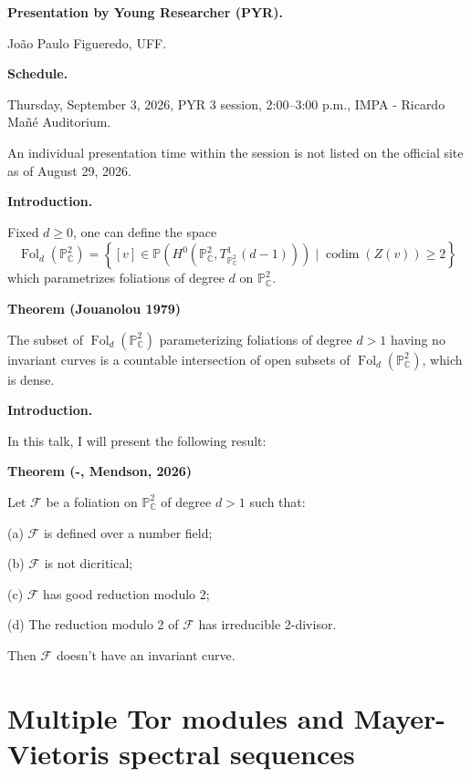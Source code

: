 \medskip\noindent
{\bf Presentation by Young Researcher
(PYR).}

Jo\~ao Paulo Figueredo,
UFF.

\medskip\noindent
{\bf Schedule.}

Thursday, September 3, 2026,
PYR 3 session, 2:00--3:00 p.m.,
IMPA - Ricardo Ma\~n\'e Auditorium.

An individual presentation time within
the session is not listed on the
official site as of August 29, 2026.

\medskip\noindent
{\bf Introduction.}

Fixed $d\geq 0$, one can define the space
$$
\operatorname{Fol}_d(\mathbb{P}_{\mathbb{C}}^2)
=
\left\{
[v]\in
\mathbb{P}\left(
H^0\left(
\mathbb{P}_{\mathbb{C}}^2,
T_{\mathbb{P}_{\mathbb{C}}^2}^{1}(d-1)
\right)
\right)
\mid
\operatorname{codim}(Z(v))\geq 2
\right\}
$$
which parametrizes foliations of degree
$d$ on $\mathbb{P}_{\mathbb{C}}^2$.

\medskip\noindent
{\bf Theorem (Jouanolou 1979)}

The subset of
$\operatorname{Fol}_d(\mathbb{P}_{\mathbb{C}}^2)$
parameterizing foliations of degree
$d>1$ having no invariant curves is a
countable intersection of open subsets of
$\operatorname{Fol}_d(\mathbb{P}_{\mathbb{C}}^2)$,
which is dense.

\medskip\noindent
{\bf Introduction.}

In this talk, I will present the following
result:

\medskip\noindent
{\bf Theorem (-, Mendson, 2026)}

Let $\mathcal{F}$ be a foliation on
$\mathbb{P}_{\mathbb{C}}^2$ of degree
$d>1$ such that:

\medskip\noindent
(a) $\mathcal{F}$ is defined over a number
field;

\medskip\noindent
(b) $\mathcal{F}$ is not dicritical;

\medskip\noindent
(c) $\mathcal{F}$ has good reduction
modulo 2;

\medskip\noindent
(d) The reduction modulo 2 of
$\mathcal{F}$ has irreducible 2-divisor.

\medskip\noindent
Then $\mathcal{F}$ doesn't have an
invariant curve.

\section{Multiple Tor modules and
Mayer-Vietoris spectral sequences}
\label{section-multiple-tor-modules}

